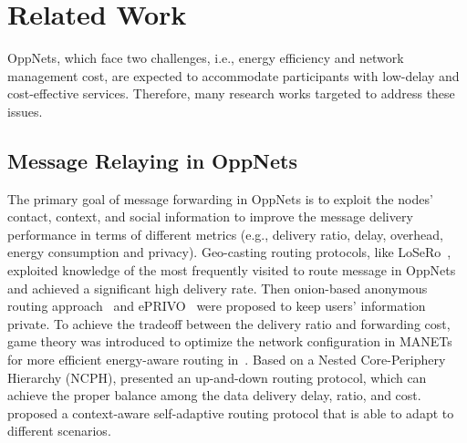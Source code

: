 \section{Related Work}
\label{sec:related}
OppNets, which face two challenges,
i.e., energy efficiency and network management cost,
are expected to accommodate participants
with low-delay and cost-effective services.
Therefore, many research works targeted to address these issues.

\subsection{Message Relaying in OppNets}
The primary goal of message forwarding in OppNets
is to exploit the nodes' contact, context,
and social information to improve
the message delivery performance
in terms of different metrics (e.g.,
delivery ratio, delay, overhead,
energy consumption and privacy).
Geo-casting routing protocols, like
LoSeRo~\cite{DBLP:journals/tmc/CostantinoMMS20},
exploited knowledge of the most frequently visited
to route message in OppNets
and achieved a significant high delivery rate.
Then onion-based anonymous routing
approach~\cite{DBLP:conf/icdcs/SakaiSKWA16}
and ePRIVO~\cite{DBLP:journals/tvt/MagaiaBPC18} were
proposed to keep users' information private.
To achieve the tradeoff between the delivery ratio
and forwarding cost,
game theory was introduced to
optimize the network configuration in MANETs
for more efficient energy-aware routing
in~\cite{DBLP:journals/monet/MaoZ15}.
Based on a Nested Core-Periphery Hierarchy (NCPH),
\cite{DBLP:journals/tvt/Zheng017} presented
an up-and-down routing protocol,
which can achieve the proper balance
among the data delivery delay, ratio, and cost.
\cite{DBLP:journals/adhoc/RosasGH20} proposed
a context-aware self-adaptive routing protocol
that is able to adapt to different scenarios.


